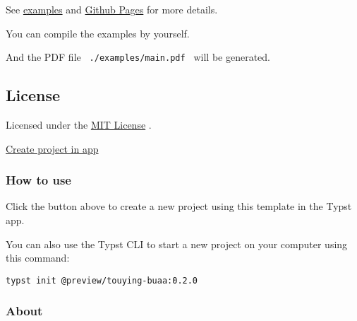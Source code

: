 See
\href{https://github.com/typst/packages/raw/main/packages/preview/touying-buaa/0.2.0/examples}{examples}
and \href{https://coekjan.github.io/touying-buaa}{Github Pages} for more
details.

You can compile the examples by yourself.

\begin{Shaded}
\begin{Highlighting}[]
\end{Highlighting}
\end{Shaded}

And the PDF file \texttt{\ ./examples/main.pdf\ } will be generated.

\subsection{License}\label{license}

Licensed under the
\href{https://github.com/typst/packages/raw/main/packages/preview/touying-buaa/0.2.0/LICENSE}{MIT
License} .

\href{/app?template=touying-buaa&version=0.2.0}{Create project in app}

\subsubsection{How to use}\label{how-to-use}

Click the button above to create a new project using this template in
the Typst app.

You can also use the Typst CLI to start a new project on your computer
using this command:

\begin{verbatim}
typst init @preview/touying-buaa:0.2.0
\end{verbatim}



\subsubsection{About}\label{about}

